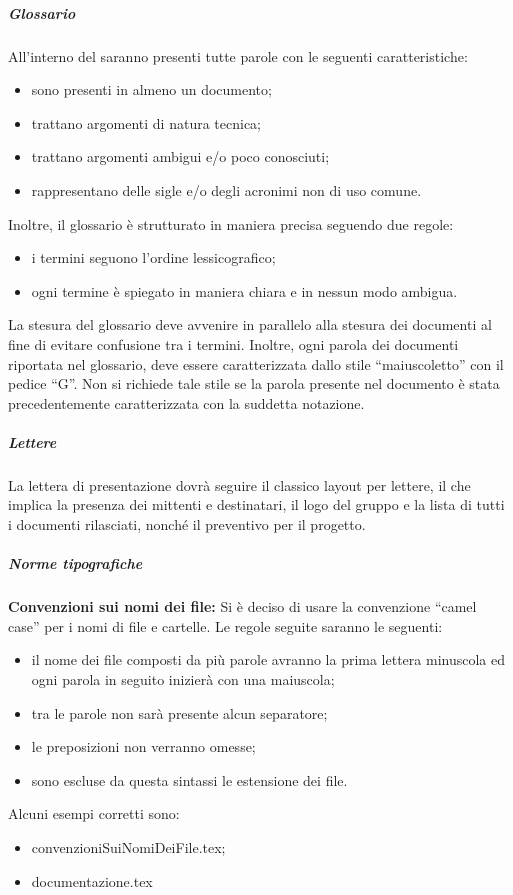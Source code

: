 				\subparagraph{Glossario}
					All'interno del  saranno presenti tutte parole con le seguenti caratteristiche:
					\begin{itemize}
						\item sono presenti in almeno un documento;
						\item trattano argomenti di natura tecnica;
						\item trattano argomenti ambigui e/o poco conosciuti;
						\item rappresentano delle sigle e/o degli acronimi non di uso comune.
					\end{itemize}
					Inoltre, il glossario è strutturato in maniera precisa seguendo due regole:
					\begin{itemize}
						\item i termini seguono l'ordine lessicografico;
						\item ogni termine è spiegato in maniera chiara e in nessun modo ambigua.
					\end{itemize}
					La stesura del glossario deve avvenire in parallelo alla stesura dei documenti al fine di evitare confusione tra i termini. Inoltre, ogni parola dei documenti riportata nel glossario, deve essere caratterizzata dallo stile ``maiuscoletto'' con il pedice ``G''. Non si richiede tale stile se la parola presente nel documento è stata precedentemente caratterizzata con la suddetta notazione.
				\subparagraph{Lettere}
					La lettera di presentazione dovrà seguire il classico layout per lettere, il che implica la presenza dei mittenti e destinatari, il logo del gruppo e la lista di tutti i documenti rilasciati, nonché il preventivo per il progetto.
			\subparagraph{Norme tipografiche}
				\textbf{Convenzioni sui nomi dei file: }
					Si è deciso di usare la convenzione ``camel case'' per i nomi di file e cartelle. Le regole seguite saranno le seguenti:
					\begin{itemize}
						\item il nome dei file composti da più parole avranno la prima lettera minuscola ed ogni parola in seguito inizierà con una maiuscola;
						\item tra le parole non sarà presente alcun separatore;
						\item le preposizioni non verranno omesse;
						\item sono escluse da questa sintassi le estensione dei file.
					\end{itemize}
					Alcuni esempi corretti sono:
					\begin{itemize}
						\item convenzioniSuiNomiDeiFile.tex;
						\item documentazione.tex
					\end{itemize}
